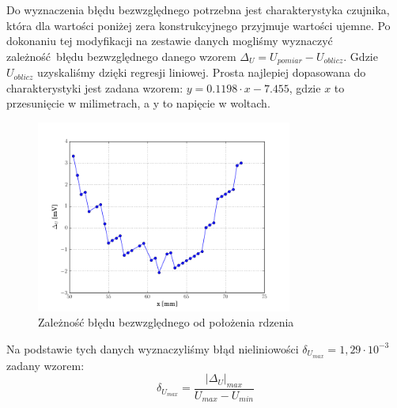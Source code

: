 \documentclass[a4paper, 12pt, titlepage]{article}
\begin{document}
				Do wyznaczenia błędu bezwzględnego potrzebna jest charakterystyka czujnika, która dla wartości poniżej zera konstrukcyjnego przyjmuje wartości ujemne. Po dokonaniu tej modyfikacji na zestawie danych mogliśmy wyznaczyć zależność błędu bezwzględnego danego wzorem $\Delta_U = U_{pomiar} - U_{oblicz}$. Gdzie $U_{oblicz}$ uzyskaliśmy dzięki regresji liniowej. Prosta najlepiej dopasowana do charakterystyki jest zadana wzorem: $y = 0.1198 \cdot x -7.455$, gdzie $x$ to przesunięcie w milimetrach, a y to napięcie w woltach.
				\begin{figure}[H]
					\centering
					\includegraphics[width=0.75\textwidth]{./img/Uac_blad.png}
					\caption{\small{Zależność błędu bezwzględnego od położenia rdzenia}}
				\end{figure} \noindent
				Na podstawie tych danych wyznaczyliśmy błąd nieliniowości $\delta_{U_{max}} = 1,29\cdot10^{-3}$ zadany wzorem:
				\begin{equation}
					\delta_{U_{max}} = \frac{|\Delta_U|_{max}}{U_{max}-U_{min}}
				\end{equation}
\end{document}
